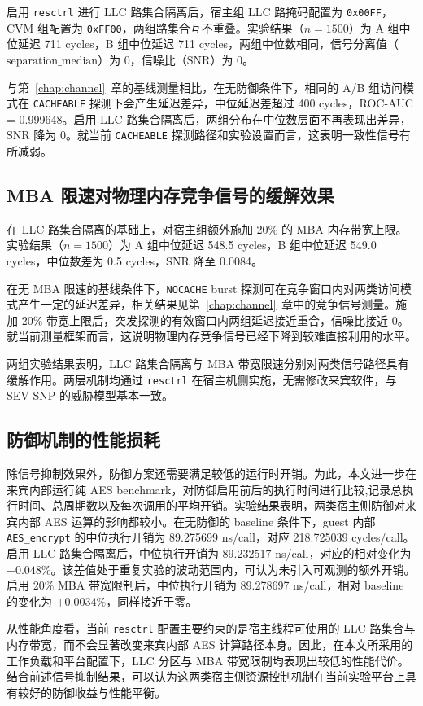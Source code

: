 启用 \texttt{resctrl} 进行 LLC 路集合隔离后，宿主组 LLC 路掩码配置为 \texttt{0x00FF}，CVM 组配置为 \texttt{0xFF00}，两组路集合互不重叠。实验结果（$n=1500$）为 A 组中位延迟 711 cycles，B 组中位延迟 711 cycles，两组中位数相同，信号分离值（$\text{separation\_median}$）为 0，信噪比（SNR）为 0。

与第~\ref{chap:channel}~章的基线测量相比，在无防御条件下，相同的 A/B 组访问模式在 \texttt{CACHEABLE} 探测下会产生延迟差异，中位延迟差超过 400 cycles，ROC-AUC = 0.999648。启用 LLC 路集合隔离后，两组分布在中位数层面不再表现出差异，SNR 降为 0。就当前 \texttt{CACHEABLE} 探测路径和实验设置而言，这表明一致性信号有所减弱。

\subsection{MBA 限速对物理内存竞争信号的缓解效果}

在 LLC 路集合隔离的基础上，对宿主组额外施加 20\% 的 MBA 内存带宽上限。实验结果（$n=1500$）为 A 组中位延迟 548.5 cycles，B 组中位延迟 549.0 cycles，中位数差为 0.5 cycles，SNR 降至 0.0084。

在无 MBA 限速的基线条件下，\texttt{NOCACHE} burst 探测可在竞争窗口内对两类访问模式产生一定的延迟差异，相关结果见第~\ref{chap:channel}~章中的竞争信号测量。施加 20\% 带宽上限后，突发探测的有效窗口内两组延迟接近重合，信噪比接近 0。就当前测量框架而言，这说明物理内存竞争信号已经下降到较难直接利用的水平。

两组实验结果表明，LLC 路集合隔离与 MBA 带宽限速分别对两类信号路径具有缓解作用。两层机制均通过 \texttt{resctrl} 在宿主机侧实施，无需修改来宾软件，与 SEV-SNP 的威胁模型基本一致。

\subsection{防御机制的性能损耗}

除信号抑制效果外，防御方案还需要满足较低的运行时开销。为此，本文进一步在来宾内部运行纯 AES benchmark，对防御启用前后的执行时间进行比较,记录总执行时间、总周期数以及每次调用的平均开销。实验结果表明，两类宿主侧防御对来宾内部 AES 运算的影响都较小。在无防御的 baseline 条件下，guest 内部 \texttt{AES\_encrypt} 的中位执行开销为 89.275699 ns/call，对应 218.725039 cycles/call。启用 LLC 路集合隔离后，中位执行开销为 89.232517 ns/call，对应的相对变化为 $-0.048\%$。该差值处于重复实验的波动范围内，可认为未引入可观测的额外开销。启用 20\% MBA 带宽限制后，中位执行开销为 89.278697 ns/call，相对 baseline 的变化为 $+0.0034\%$，同样接近于零。

从性能角度看，当前 \texttt{resctrl} 配置主要约束的是宿主线程可使用的 LLC 路集合与内存带宽，而不会显著改变来宾内部 AES 计算路径本身。因此，在本文所采用的工作负载和平台配置下，LLC 分区与 MBA 带宽限制均表现出较低的性能代价。结合前述信号抑制结果，可以认为这两类宿主侧资源控制机制在当前实验平台上具有较好的防御收益与性能平衡。
